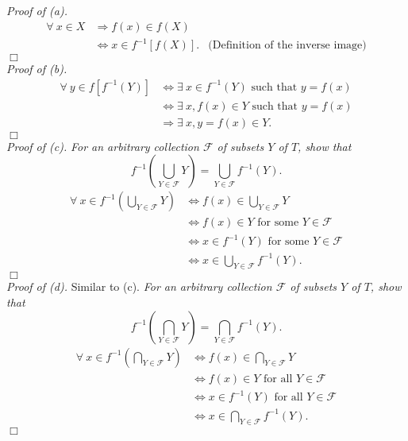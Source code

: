\documentclass{article}
\begin{document}
\emph{Proof of (a).}
\begin{align*}
  \forall \: x \in X
  &\Longrightarrow
  f(x) \in f(X)
    & \\
  &\Longleftrightarrow
  x \in f^{-1}[f(X)].
    &\text{(Definition of the inverse image)}
\end{align*}
$\Box$ \\

\emph{Proof of (b).}
\begin{align*}
  \forall \: y \in f[f^{-1}(Y)]
  &\Longleftrightarrow
  \exists \: x \in f^{-1}(Y) \text{ such that } y = f(x) \\
  &\Longleftrightarrow
  \exists \: x, f(x) \in Y \text{ such that } y = f(x) \\
  &\Longrightarrow
  \exists \: x, y = f(x) \in Y.
\end{align*}
$\Box$ \\

\emph{Proof of (c).}
\emph{For an arbitrary collection $\mathscr{F}$ of subsets $Y$ of $T$,
show that
$$f^{-1}\left( \bigcup_{Y \in \mathscr{F}} Y \right)
= \bigcup_{Y \in \mathscr{F}} f^{-1}(Y).$$}
\begin{align*}
  \forall \: x \in f^{-1}\left( \bigcup_{Y \in \mathscr{F}} Y \right)
  &\Longleftrightarrow
  f(x) \in \bigcup_{Y \in \mathscr{F}} Y \\
  &\Longleftrightarrow
  f(x) \in Y \text{ for some } Y \in \mathscr{F} \\
  &\Longleftrightarrow
  x \in f^{-1}(Y) \text{ for some } Y \in \mathscr{F} \\
  &\Longleftrightarrow
  x \in \bigcup_{Y \in \mathscr{F}} f^{-1}(Y).
\end{align*}
$\Box$ \\

\emph{Proof of (d).}
Similar to (c).
\emph{For an arbitrary collection $\mathscr{F}$ of subsets $Y$ of $T$,
show that
$$f^{-1}\left( \bigcap_{Y \in \mathscr{F}} Y \right)
= \bigcap_{Y \in \mathscr{F}} f^{-1}(Y).$$}
\begin{align*}
  \forall \: x \in f^{-1}\left( \bigcap_{Y \in \mathscr{F}} Y \right)
  &\Longleftrightarrow
  f(x) \in \bigcap_{Y \in \mathscr{F}} Y \\
  &\Longleftrightarrow
  f(x) \in Y \text{ for all } Y \in \mathscr{F} \\
  &\Longleftrightarrow
  x \in f^{-1}(Y) \text{ for all } Y \in \mathscr{F} \\
  &\Longleftrightarrow
  x \in \bigcap_{Y \in \mathscr{F}} f^{-1}(Y).
\end{align*}
$\Box$ \\
\end{document}
